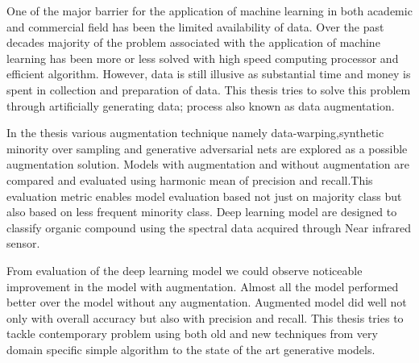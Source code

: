 

One of the major barrier for the application of machine learning in both academic and commercial field has been the limited availability of data. Over the past
decades majority of the problem associated with the application of machine
learning has been more or less solved with high speed computing processor and
efficient algorithm. However, data is still illusive as substantial time and money
is spent in collection and preparation of data. This thesis tries to solve
this problem through artificially generating data; process also known as data
augmentation.

In the thesis various augmentation technique namely data-warping,synthetic minority over sampling and generative adversarial nets are explored as a possible
augmentation solution. Models with augmentation and without augmentation are compared and evaluated using harmonic mean of precision and recall.This evaluation metric enables model evaluation based not just on majority class but also based on less frequent minority class. Deep learning model are designed to classify organic compound using the spectral data acquired through Near infrared sensor.

From evaluation of the deep learning model we could observe noticeable improvement in the model with augmentation. Almost all the model performed better over the model without any augmentation. Augmented model did well not only with overall accuracy but also with precision and recall. This thesis tries to tackle contemporary problem using both old and new techniques from very domain specific simple algorithm to the state of the art generative models.